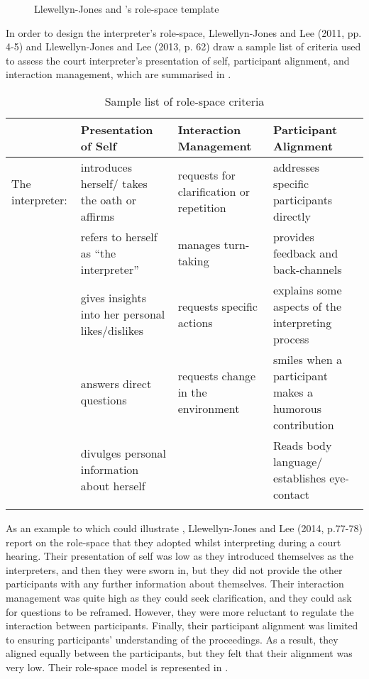 \documentclass[output=paper]{langsci/langscibook}
\begin{document}
  

 

\begin{figure}
\caption{Llewellyn-Jones and \citet{Lee2014}'s role-space template\label{fig:devaux:1}}
\end{figure}

In order to design the interpreter’s role-space, Llewellyn-Jones and Lee (2011, pp. 4-5) and Llewellyn-Jones and Lee (2013, p. 62) draw a sample list of criteria used to assess the court interpreter’s presentation of self, participant alignment, and interaction management, which are summarised in . 

\begin{table}
\begin{tabularx}{\textwidth}{XXXX}
\lsptoprule
& Presentation of Self & Interaction Management & Participant Alignment\\\midrule
 The interpreter: & introduces herself/ takes the oath or affirms & requests for clarification or repetition & addresses specific participants directly\\
& refers to herself as “the interpreter” & manages turn-taking & provides feedback and back-channels\\
& gives insights into her personal likes/dislikes & requests specific actions & explains some aspects of the interpreting process\\
& answers direct questions & requests change in the environment & smiles when a participant makes a humorous contribution\\
& divulges personal information about herself &  & Reads body language/ establishes eye-contact\\
\lspbottomrule
\end{tabularx}
\caption{\label{tab:devaux:1}Sample list of role-space criteria}
\end{table}

As an example to which could illustrate , Llewellyn-Jones and Lee (2014, p.77-78) report on the role-space that they adopted whilst interpreting during a court hearing. Their presentation of self was low as they introduced themselves as the interpreters, and then they were sworn in, but they did not provide the other participants with any further information about themselves. Their interaction management was quite high as they could seek clarification, and they could ask for questions to be reframed. However, they were more reluctant to regulate the interaction between participants. Finally, their participant alignment was limited to ensuring participants’ understanding of the proceedings. As a result, they aligned equally between the participants, but they felt that their alignment was very low. Their role-space model is represented in . 
\end{document}
